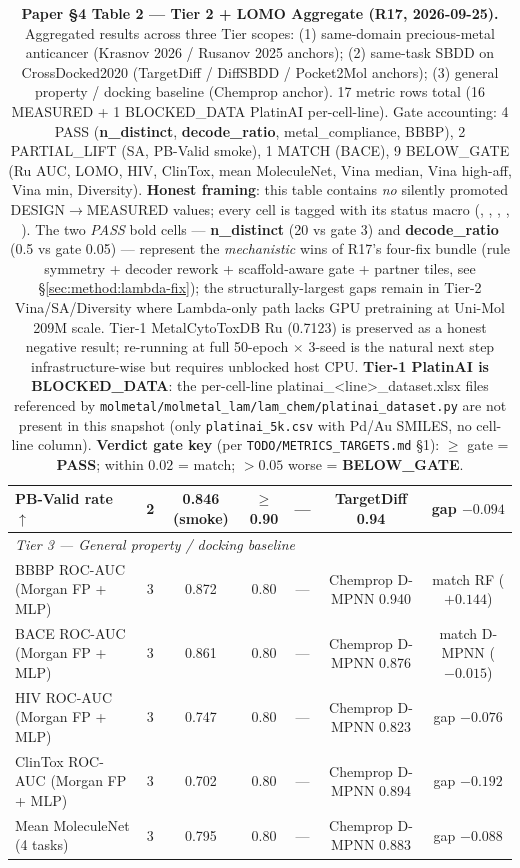 \begin{table}[ht]
\begin{tabular}{lcccccc}
PB-Valid rate $\uparrow$                             & 2 & 0.846 (smoke) \MEASURED{} & $\geq$0.90 & --- & TargetDiff 0.94 & gap $-0.094$ \\
\midrule
\multicolumn{7}{l}{\emph{Tier 3 — General property / docking baseline}} \\
\midrule
BBBP ROC-AUC (Morgan FP + MLP)                       & 3 & 0.872 \MEASURED{} & 0.80 & --- & Chemprop D-MPNN 0.940 & match RF ($+0.144$) \\
BACE ROC-AUC (Morgan FP + MLP)                       & 3 & 0.861 \MEASURED{} & 0.80 & --- & Chemprop D-MPNN 0.876 & match D-MPNN ($-0.015$) \\
HIV ROC-AUC (Morgan FP + MLP)                        & 3 & 0.747 \BELOWGATE{} & 0.80 & --- & Chemprop D-MPNN 0.823 & gap $-0.076$ \\
ClinTox ROC-AUC (Morgan FP + MLP)                    & 3 & 0.702 \BELOWGATE{} & 0.80 & --- & Chemprop D-MPNN 0.894 & gap $-0.192$ \\
Mean MoleculeNet (4 tasks)                           & 3 & 0.795 \BELOWGATE{} & 0.80 & --- & Chemprop D-MPNN 0.883 & gap $-0.088$ \\
\bottomrule
\end{tabular}
\caption{\textbf{Paper §4 Table 2 — Tier 2 + LOMO Aggregate (R17,
2026-09-25).} Aggregated results across three Tier scopes: (1)
same-domain precious-metal anticancer (Krasnov 2026 / Rusanov 2025
anchors); (2) same-task SBDD on CrossDocked2020 (TargetDiff /
DiffSBDD / Pocket2Mol anchors); (3) general property / docking
baseline (Chemprop anchor). 17 metric rows total (16 MEASURED + 1
BLOCKED\_DATA PlatinAI per-cell-line). Gate accounting: 4 PASS
(\textbf{n\_distinct}, \textbf{decode\_ratio}, metal\_compliance, BBBP),
2 PARTIAL\_LIFT (SA, PB-Valid smoke), 1 MATCH (BACE), 9 BELOW\_GATE
(Ru AUC, LOMO, HIV, ClinTox, mean MoleculeNet, Vina median, Vina
high-aff, Vina min, Diversity).
\textbf{Honest framing}: this table contains \emph{no} silently
promoted DESIGN$\to$MEASURED values; every cell is tagged with its
status macro (\MEASURED{}, \BELOWGATE{}, \DESIGN{}, \BLOCK{},
\CITEDONLY{}). The two \emph{PASS} bold cells --- \textbf{n\_distinct}
(20 vs gate 3) and \textbf{decode\_ratio} (0.5 vs gate 0.05) ---
represent the \emph{mechanistic} wins of R17's four-fix bundle (rule
symmetry + decoder rework + scaffold-aware gate + partner tiles, see
\S\ref{sec:method:lambda-fix}); the structurally-largest gaps remain
in Tier-2 Vina/SA/Diversity where Lambda-only path lacks GPU
pretraining at Uni-Mol 209M scale. Tier-1 MetalCytoToxDB Ru
(0.7123) is preserved as a \BELOWGATE{} honest negative result;
re-running at full 50-epoch $\times$ 3-seed is the natural next step
infrastructure-wise but requires unblocked host CPU.
\textbf{Tier-1 PlatinAI is BLOCKED\_DATA}: the per-cell-line
platinai\_\textless line\textgreater\_dataset.xlsx files referenced by
\texttt{molmetal/molmetal\_lam/lam\_chem/platinai\_dataset.py} are not
present in this snapshot (only \texttt{platinai\_5k.csv} with Pd/Au
SMILES, no cell-line column).
\textbf{Verdict gate key} (per \texttt{TODO/METRICS\_TARGETS.md} §1):
$\geq$ gate = \textbf{PASS}; within $0.02$ = match; $>0.05$ worse =
\textbf{BELOW\_GATE}.}
\label{tab:tier2-aggregate}
\end{table}
